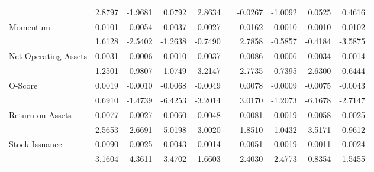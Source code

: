 \begin{table}[h]
{\begin{tabular}{lrrrrlrrrr}
            & 2.8797 & -1.9681 & 0.0792 & 2.8634 &       & -0.0267 & -1.0092 & 0.0525 & 0.4616 \\
      Momentum & 0.0101 & -0.0054 & -0.0037 & -0.0027 &       & 0.0162 & -0.0010 & -0.0010 & -0.0102 \\
            & 1.6128 & -2.5402 & -1.2638 & -0.7490 &       & 2.7858 & -0.5857 & -0.4184 & -3.5875 \\
      Net Operating Assets & 0.0031 & 0.0006 & 0.0010 & 0.0037 &       & 0.0086 & -0.0006 & -0.0034 & -0.0014 \\
            & 1.2501 & 0.9807 & 1.0749 & 3.2147 &       & 2.7735 & -0.7395 & -2.6300 & -0.6444 \\
      O-Score & 0.0019 & -0.0010 & -0.0068 & -0.0049 &       & 0.0078 & -0.0009 & -0.0075 & -0.0043 \\
            & 0.6910 & -1.4739 & -6.4253 & -3.2014 &       & 3.0170 & -1.2073 & -6.1678 & -2.7147 \\
      Return on Assets & 0.0077 & -0.0027 & -0.0060 & -0.0048 &       & 0.0081 & -0.0019 & -0.0058 & 0.0025 \\
            & 2.5653 & -2.6691 & -5.0198 & -3.0020 &       & 1.8510 & -1.0432 & -3.5171 & 0.9612 \\
      Stock Issuance & 0.0090 & -0.0025 & -0.0043 & -0.0014 &       & 0.0051 & -0.0019 & -0.0011 & 0.0024 \\
            & 3.1604 & -4.3611 & -3.4702 & -1.6603 &       & 2.4030 & -2.4773 & -0.8354 & 1.5455 \\
      \bottomrule
      \end{tabular}%
    }
    \label{tab:epu-ff3}%
  \end{table}%

